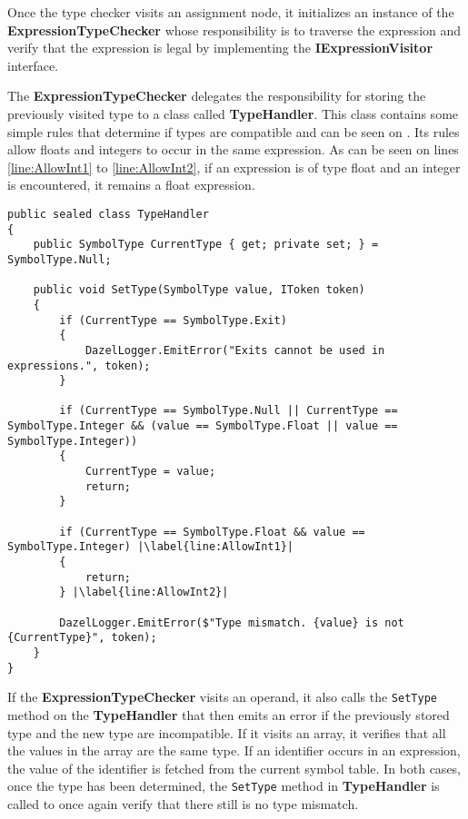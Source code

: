 Once the type checker visits an assignment node, it initializes an instance of the \textbf{ExpressionTypeChecker} whose responsibility is to traverse the expression and verify that the expression is legal by implementing the \textbf{IExpressionVisitor} interface. 

The \textbf{ExpressionTypeChecker} delegates the responsibility for storing the previously visited type to a class called \textbf{TypeHandler}. This class contains some simple rules that determine if types are compatible and can be seen on . 
Its rules allow floats and integers to occur in the same expression. As can be seen on lines \ref{line:AllowInt1} to \ref{line:AllowInt2}, if an expression is of type float and an integer is encountered, it remains a float expression.

\begin{lstlisting}[language=CSharp, caption={The \textbf{TypeHandler} class.}, label={lst:TypeHandler},escapechar=|]
public sealed class TypeHandler
{
    public SymbolType CurrentType { get; private set; } = SymbolType.Null;

    public void SetType(SymbolType value, IToken token)
    {
        if (CurrentType == SymbolType.Exit)
        {
            DazelLogger.EmitError("Exits cannot be used in expressions.", token);
        }
            
        if (CurrentType == SymbolType.Null || CurrentType == SymbolType.Integer && (value == SymbolType.Float || value == SymbolType.Integer))
        {
            CurrentType = value;
            return;
        }
            
        if (CurrentType == SymbolType.Float && value == SymbolType.Integer) |\label{line:AllowInt1}|
        {
            return;
        } |\label{line:AllowInt2}|
            
        DazelLogger.EmitError($"Type mismatch. {value} is not {CurrentType}", token);
    }
}
\end{lstlisting}

If the \textbf{ExpressionTypeChecker} visits an operand, it also calls the \texttt{SetType} method on the \textbf{TypeHandler} that then emits an error if the previously stored type and the new type are incompatible. 
If it visits an array, it verifies that all the values in the array are the same type. 
If an identifier occurs in an expression, the value of the identifier is fetched from the current symbol table.
In both cases, once the type has been determined, the \texttt{SetType} method in \textbf{TypeHandler} is called to once again verify that there still is no type mismatch.


